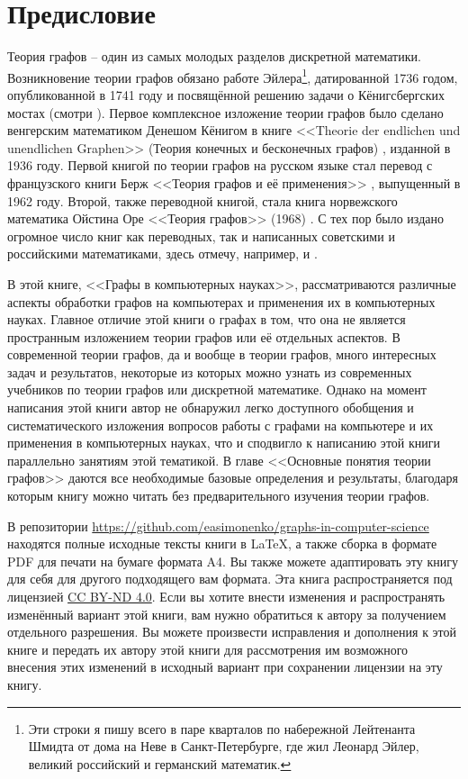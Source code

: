 
\section*{Предисловие}

Теория графов – один из самых молодых разделов дискретной математики. 
Возникновение теории графов обязано работе Эйлера\footnote{Эти строки я пишу 
всего в паре кварталов по набережной Лейтенанта Шмидта от дома на Неве в 
Санкт-Петербурге, где жил Леонард Эйлер, великий российский и германский 
математик.}, датированной 1736 годом, опубликованной в 1741 году и посвящённой 
решению задачи о Кёнигсбергских мостах (смотри \cite{Fleischner}). Первое 
комплексное изложение теории графов было сделано венгерским математиком Денешом 
Кёнигом в книге <<Theorie der endlichen und unendlichen Graphen>> (Теория 
конечных и бесконечных графов) \cite{Koenig}, изданной в 1936 году. Первой 
книгой по теории графов на русском языке стал перевод с французского книги Берж 
<<Теория графов и её применения>> \cite{Berge}, выпущенный в 1962 году. Второй, 
также переводной книгой, стала книга норвежского математика Ойстина Оре 
<<Теория графов>> (1968) \cite{Ore}. С тех пор было издано огромное число книг 
как переводных, так и написанных советскими и российскими математиками, здесь 
отмечу, например, \cite{Okulov} и \cite{Lando}.

В этой книге, <<Графы в компьютерных науках>>, рассматриваются различные 
аспекты обработки графов на компьютерах и применения их в компьютерных науках.
Главное отличие этой книги о графах в том, что она не является пространным 
изложением теории графов или её отдельных аспектов. В современной теории 
графов, да и вообще в теории графов, много интересных задач и результатов, 
некоторые из которых можно узнать из современных учебников по теории графов или 
дискретной математике. Однако на момент написания этой книги автор не обнаружил 
легко доступного обобщения и систематического изложения вопросов работы с 
графами на компьютере и их применения в компьютерных науках, что и сподвигло к 
написанию этой книги параллельно занятиям этой тематикой. В главе <<Основные 
понятия теории графов>> даются все необходимые базовые определения и 
результаты, благодаря которым книгу можно читать без предварительного изучения 
теории графов.

В репозитории \url{https://github.com/easimonenko/graphs-in-computer-science} 
находятся полные исходные тексты книги в \LaTeX, а также сборка в формате PDF 
для печати на бумаге формата A4. Вы также можете адаптировать эту книгу для 
себя для другого подходящего вам формата. Эта книга распространяется под 
лицензией
\href{https://creativecommons.org/licenses/by-nd/4.0/legalcode}{CC BY-ND 4.0}. 
Если вы хотите внести изменения и распространять изменённый вариант этой книги, 
вам нужно обратиться к автору за получением отдельного разрешения. Вы можете 
произвести исправления и дополнения к этой книге и передать их автору этой 
книги для рассмотрения им возможного внесения этих изменений в исходный вариант 
при сохранении лицензии на эту книгу.
